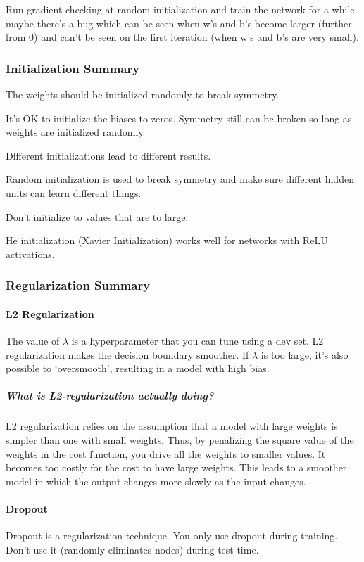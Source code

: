 Run gradient checking at random initialization and train the network for a while maybe there's a bug which can be seen when w's and b's become larger (further from 0) and can't be seen on the first iteration (when w's and b's are very small).

\subsubsection{Initialization Summary}
The weights should be initialized randomly to break symmetry.

It's OK to initialize the biases to zeros. Symmetry still can be broken so long as weights are initialized randomly.

Different initializations lead to different results.

Random initialization is used to break symmetry and make sure different hidden units can learn different things.

Don't initialize to values that are to large.

He initialization (Xavier Initialization) works well for networks with ReLU activations.

\subsubsection{Regularization Summary}
\paragraph{L2 Regularization}
The value of $\lambda$ is a hyperparameter that you can tune using a dev set. L2 regularization makes the decision boundary smoother. If $\lambda$ is too large, it's also possible to `oversmooth', resulting in a model with high bias.

\subparagraph{What is L2-regularization actually doing?} L2 regularization relies on the assumption that a model with large weights is simpler than one with small weights. Thus, by penalizing the square value of the weights in the cost function, you drive all the weights to smaller values. It becomes too costly for the cost to have large weights. This leads to a smoother model in which the output changes more slowly as the input changes.

\paragraph{Dropout}
Dropout is a regularization technique. You only use dropout during training. Don't use it (randomly eliminates nodes) during test time.

